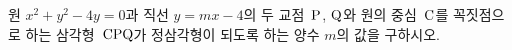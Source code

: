 원 $x^2+y^2-4y=0$과 직선 $y=mx-4$의 두 교점~$\mathrm{P}$, $\mathrm{Q}$와 원의 중심~$\mathrm{C}$를 꼭짓점으로 하는 삼각형~$\mathrm{CPQ}$가 정삼각형이 되도록 하는 양수 $m$의 값을 구하시오.
